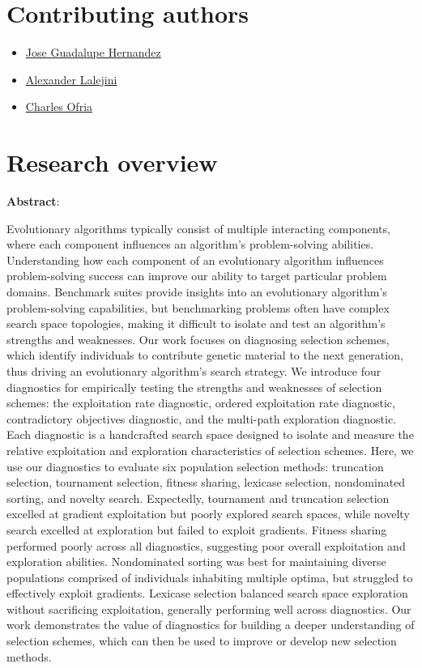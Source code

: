 \documentclass[]{book}
\providecommand{\tightlist}{%
  \setlength{\itemsep}{0pt}\setlength{\parskip}{0pt}}
\begin{document}
\hypertarget{contributing-authors}{%
\section{Contributing authors}\label{contributing-authors}}

\begin{itemize}
\tightlist
\item
  \href{https://jgh9094.github.io/}{Jose Guadalupe Hernandez}
\item
  \href{https://lalejini.com}{Alexander Lalejini}
\item
  \href{http://ofria.com}{Charles Ofria}
\end{itemize}

\hypertarget{research-overview}{%
\section{Research overview}\label{research-overview}}

\textbf{Abstract}:

Evolutionary algorithms typically consist of multiple interacting components, where each component influences an algorithm's problem-solving abilities.
Understanding how each component of an evolutionary algorithm influences problem-solving success can improve our ability to target particular problem domains.
Benchmark suites provide insights into an evolutionary algorithm's problem-solving capabilities, but benchmarking problems often have complex search space topologies, making it difficult to isolate and test an algorithm's strengths and weaknesses.
Our work focuses on diagnosing selection schemes, which identify individuals to contribute genetic material to the next generation, thus driving an evolutionary algorithm's search strategy.
We introduce four diagnostics for empirically testing the strengths and weaknesses of selection schemes: the exploitation rate diagnostic, ordered exploitation rate diagnostic, contradictory objectives diagnostic, and the multi-path exploration diagnostic.
Each diagnostic is a handcrafted search space designed to isolate and measure the relative exploitation and exploration characteristics of selection schemes.
Here, we use our diagnostics to evaluate six population selection methods: truncation selection, tournament selection, fitness sharing, lexicase selection, nondominated sorting, and novelty search.
Expectedly, tournament and truncation selection excelled at gradient exploitation but poorly explored search spaces, while novelty search excelled at exploration but failed to exploit gradients.
Fitness sharing performed poorly across all diagnostics, suggesting poor overall exploitation and exploration abilities.
Nondominated sorting was best for maintaining diverse populations comprised of individuals inhabiting multiple optima, but struggled to effectively exploit gradients.
Lexicase selection balanced search space exploration without sacrificing exploitation, generally performing well across diagnostics.
Our work demonstrates the value of diagnostics for building a deeper understanding of selection schemes, which can then be used to improve or develop new selection methods.
\end{document}
